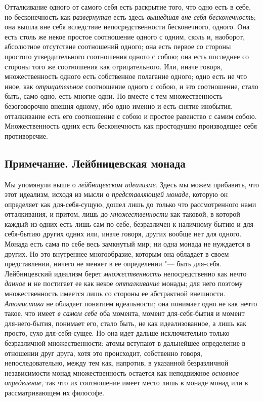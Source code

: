 Отталкивание одного от самого себя есть раскрытие того, что одно есть в
себе, но бесконечность как {\em развернутая} есть здесь
{\em вышедшая вне себя бесконечность}; она вышла вне
себя вследствие непосредственности бесконечного, одного. Она есть столь же
некое простое соотношение одного с одним, сколь и, наоборот, абсолютное
отсутствие соотношений одного; она есть первое со стороны простого
утвердительного соотношения одного с собою; она есть последнее со стороны
того же соотношения как отрицательного. Или, иначе говоря, множественность
одного есть собственное полагание одного; одно есть не что иное, как
{\em отрицательное} соотношение одного с собою, и это
соотношение, стало быть, само одно, есть многие одни. Но вместе с тем
множественность безоговорочно внешня одному, ибо одно именно и есть снятие
инобытия, отталкивание есть его соотношение с собою и простое равенство с
самим собою. Множественность одних есть бесконечность как простодушно
производящее себя противоречие.

\subsection*{Примечание. Лейбницевская монада}

Мы упомянули выше о {\em лейбницевском идеализме}. Здесь
мы можем прибавить, что этот идеализм, исходя из мысли о
{\em представляющей монаде}, которую он определяет как
для-себя-сущую, дошел лишь до только что рассмотренного нами отталкивания,
и притом, лишь до {\em множественности} как таковой, в
которой каждый из одних есть лишь сам по себе, безразличен к наличному
бытию и для-себя-бытию других одних или, иначе говоря, других вообще нет
для одного. Монада есть сама по себе весь замкнутый мир; ни одна монада не
нуждается в других. Но это внутреннее многообразие, которым она обладает в
своем представлении, ничего не меняет в ее определении "--- быть для-себя.
Лейбницевский идеализм берет {\em множественность}
непосредственно как нечто {\em данное} и не постигает
ее как некое {\em отталкивание} монады; для него
поэтому множественность имеется лишь со стороны ее абстрактной внешности.
{\em Атомистика} не обладает понятием идеальности; она
понимает одно не как нечто такое, что имеет {\em в
самом себе} оба момента, момент для-себя-бытия и момент для-него-бытия,
понимает его, стало быть, не как идеализованное, а лишь как просто, сухо
для-себя-сущее. Но она идет дальше исключительно только безразличной
множественности; атомы вступают в дальнейшее определение в отношении друг
друга, хотя это происходит, собственно говоря, непоследовательно, между тем
как, напротив, в указанной безразличной независимости монад множественность
остается как неподвижное {\em основное определение},
так что их соотношение имеет место лишь в монаде монад или в
рассматривающем их философе.


